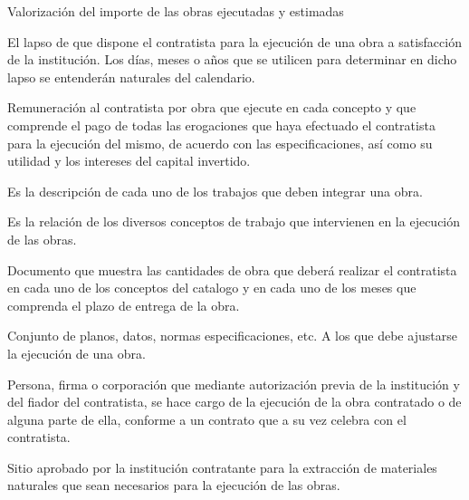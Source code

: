 \begin{definition}[Liquidación]
    Valorización del importe de las obras ejecutadas y estimadas
\end{definition}
\begin{definition}
    El lapso de que dispone el contratista para la ejecución de una obra a satisfacción de la institución. Los días, meses o años que se utilicen para determinar en dicho lapso se entenderán naturales del calendario.
\end{definition}
\begin{definition}
    Remuneración al contratista por obra que ejecute en cada concepto y que comprende el pago de todas las erogaciones que haya efectuado el contratista para la ejecución del mismo, de acuerdo con las especificaciones, así como su utilidad y los intereses del capital invertido.
\end{definition}
\begin{definition}
    Es la descripción de cada uno de los trabajos que deben integrar una obra.
\end{definition}
\begin{definition}
    Es la relación de los diversos conceptos de trabajo que intervienen en la ejecución de las obras.
\end{definition}
\begin{definition}
    Documento que muestra las cantidades de obra que deberá realizar el contratista en cada uno de los conceptos del catalogo y en cada uno de los meses que comprenda el plazo de entrega de la obra.
\end{definition}
\begin{definition}[Proyecto]
    Conjunto de planos, datos, normas especificaciones, etc. A los que debe ajustarse la ejecución de una obra.
\end{definition}
\begin{definition}[Subcontratista]
    Persona, firma o corporación que mediante autorización previa de la institución y del fiador del contratista, se hace cargo de la ejecución de la obra contratado o de alguna parte de ella, conforme a un contrato que a su vez celebra con el contratista.
\end{definition}
\begin{definition}
    Sitio aprobado por la institución contratante para la extracción de materiales naturales que sean necesarios para la ejecución de las obras.
\end{definition}
